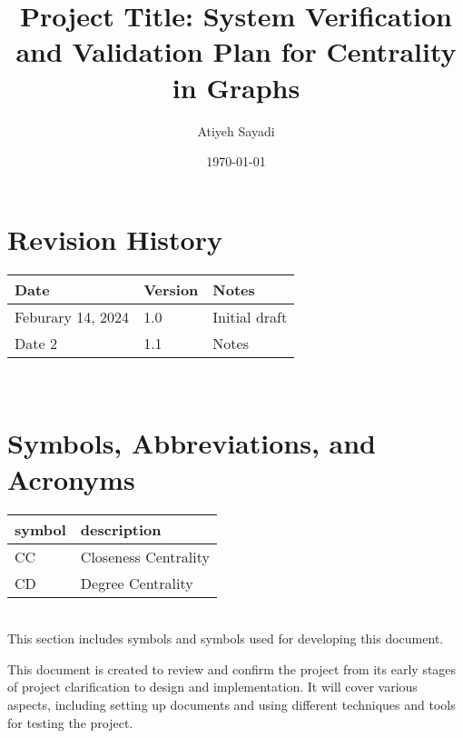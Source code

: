 \documentclass[12pt, titlepage]{article}
\begin{document}
\title{Project Title: System Verification and Validation Plan for Centrality in Graphs{}} 
\author{Atiyeh Sayadi}
\date{\today}
	
\maketitle


\section*{Revision History}

\begin{tabularx}{\textwidth}{p{3cm}p{2cm}X}
\toprule {\bf Date} & {\bf Version} & {\bf Notes}\\
\midrule
Feburary 14,  2024 & 1.0 & Initial draft\\
Date 2 & 1.1 & Notes\\
\bottomrule
\end{tabularx}

~\\


\newpage

\tableofcontents

\listoftables
{}

\listoffigures
{}

\newpage

\section{Symbols, Abbreviations, and Acronyms}

\renewcommand{\arraystretch}{1.2}
\begin{tabular}{l l} 
  \toprule		
  \textbf{symbol} & \textbf{description}\\
  \midrule 
  CC& Closeness Centrality \\
  CD& Degree Centrality  \\
  \bottomrule
\end{tabular}\\

This section includes symbols and symbols used for developing this document.


\newpage



This document is created to review and confirm the project from its early stages of project clarification to design and implementation. It will cover various aspects, including setting up documents and using different techniques and tools for testing the project.
\end{document}
